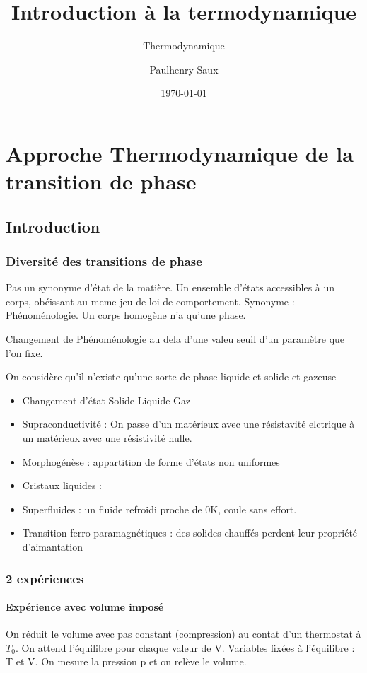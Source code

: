 \documentclass[french]{yLectureNote}
\title{Introduction à la termodynamique}
\subtitle{Thermodynamique}
\author{Paulhenry Saux}
\date{\today}
\begin{document}
\setcounter{chapter}{4}

\chapter{Approche  Thermodynamique de la transition de phase}
\section{Introduction}
\subsection{Diversité des transitions de phase}
\begin{definition}
    Pas un synonyme d'état de la matière. Un ensemble d'états accessibles à un corps, obéissant au meme jeu de loi de comportement. Synonyme : Phénoménologie. Un corps homogène n'a qu'une phase.
\end{definition}
\begin{definition}
    Changement de Phénoménologie au dela d'une valeu seuil d'un paramètre que l'on fixe.
\end{definition}
On considère qu'il n'existe qu'une sorte de  phase liquide et solide et gazeuse


\begin{itemize}
    \item Changement d'état Solide-Liquide-Gaz
    \item Supraconductivité : On passe d'un matérieux avec une résistavité elctrique à un matérieux avec une résistivité nulle.
    \item Morphogénèse : appartition de forme d'états non uniformes
    \item Cristaux liquides : 
    \item Superfluides : un fluide refroidi proche de 0K, coule sans effort.
    \item Transition ferro-paramagnétiques : des solides chauffés perdent leur propriété d'aimantation
\end{itemize}
\subsection{2 expériences}
\subsubsection{Expérience avec volume imposé}
On réduit le volume avec pas constant (compression) au contat d'un thermostat à $T_0$. On attend l'équilibre pour chaque valeur de V. Variables fixées à l'équilibre : T et V. On mesure la pression p et on relève le volume.
\end{document}
